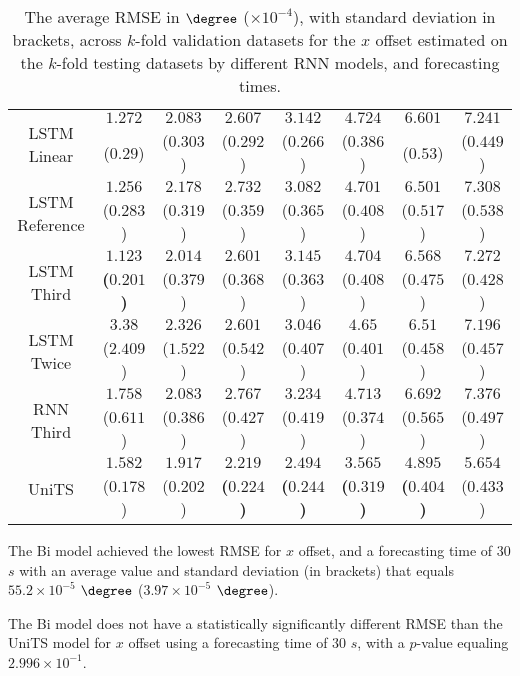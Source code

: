 \begin{table}[!ht]
{\begin{tabular}{|c|c|c|c|c|c|c|c|}
			\multirow{2}{*}{LSTM Linear} & $1.272$ & $2.083$ & $2.607$ & $3.142$ & $4.724$ & $6.601$ & $7.241$ \\
			 & ($0.29$) & ($0.303$) & ($0.292$) & ($0.266$) & ($0.386$) & ($0.53$) & ($0.449$) \\ \hline
			\multirow{2}{*}{LSTM Reference} & $1.256$ & $2.178$ & $2.732$ & $3.082$ & $4.701$ & $6.501$ & $7.308$ \\
			 & ($0.283$) & ($0.319$) & ($0.359$) & ($0.365$) & ($0.408$) & ($0.517$) & ($0.538$) \\ \hline
			\multirow{2}{*}{LSTM Third} & $\mathbf{1.123}$ & $2.014$ & $2.601$ & $3.145$ & $4.704$ & $6.568$ & $7.272$ \\
			 & \textbf{(}$\mathbf{0.201}$\textbf{)} & ($0.379$) & ($0.368$) & ($0.363$) & ($0.408$) & ($0.475$) & ($0.428$) \\ \hline
			\multirow{2}{*}{LSTM Twice} & $3.38$ & $2.326$ & $2.601$ & $3.046$ & $4.65$ & $6.51$ & $7.196$ \\
			 & ($2.409$) & ($1.522$) & ($0.542$) & ($0.407$) & ($0.401$) & ($0.458$) & ($0.457$) \\ \hline
			\multirow{2}{*}{RNN Third} & $1.758$ & $2.083$ & $2.767$ & $3.234$ & $4.713$ & $6.692$ & $7.376$ \\
			 & ($0.611$) & ($0.386$) & ($0.427$) & ($0.419$) & ($0.374$) & ($0.565$) & ($0.497$) \\ \hline
			\multirow{2}{*}{UniTS} & $1.582$ & $1.917$ & $\mathbf{2.219}$ & $\mathbf{2.494}$ & $\mathbf{3.565}$ & $\mathbf{4.895}$ & $5.654$ \\
			 & ($0.178$) & ($0.202$) & \textbf{(}$\mathbf{0.224}$\textbf{)} & \textbf{(}$\mathbf{0.244}$\textbf{)} & \textbf{(}$\mathbf{0.319}$\textbf{)} & \textbf{(}$\mathbf{0.404}$\textbf{)} & ($0.433$) \\ \hline
		\end{tabular}
	}
	\caption{The average RMSE in $\degree$ ($\times 10^{-4}$), with standard deviation in brackets, across $k$-fold validation datasets for the $x$ offset estimated on the $k$-fold testing datasets by different RNN models, and forecasting times.}
	\label{tab:wilcoxon_longitude_no_abs_RMSE}
\end{table}

The Bi model achieved the lowest RMSE for $x$ offset, and a forecasting time of $30$ $s$ with an average value and standard deviation (in brackets) that equals $55.2 \times 10^{-5}$ $\degree$ ($3.97 \times 10^{-5}$ $\degree$).

The Bi model does not have a statistically significantly different RMSE than the UniTS model for $x$ offset using a forecasting time of $30$ $s$, with a $p$-value equaling $2.996 \times 10^{-1}$.

